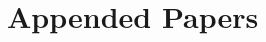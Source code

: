 \documentclass[10pt,onecolumn,openright]{book}
\begin{document}
\printbibliography


\newpage
\cleardoublepage
\part{Appended Papers}
\newpage
\cleardoublepage



%
%
\end{document}
